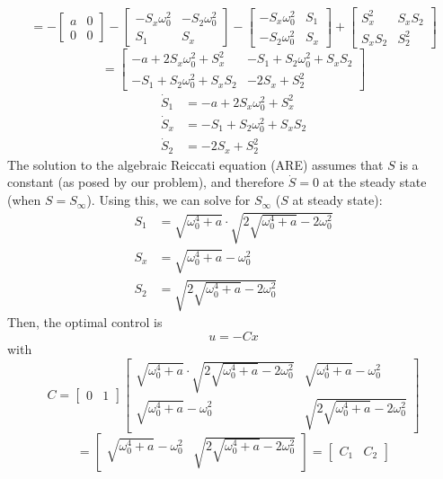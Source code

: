 \documentclass{article}
\begin{document}
\[= -\left[\begin{matrix}
    a & 0 \\
    0 & 0
\end{matrix}\right] - \left[\begin{matrix}
    -S_x\omega_0^2 & -S_2\omega_0^2 \\
    S_1 & S_x
\end{matrix}\right] - \left[\begin{matrix}
    -S_x\omega_0^2 & S_1 \\
    -S_2\omega_0^2 & S_x
\end{matrix}\right] + \left[\begin{matrix}
    S_x^2 & S_xS_2 \\
    S_xS_2 & S_2^2
\end{matrix}\right]\]
\[= \left[\begin{matrix}
    -a+2S_x\omega_0^2+S_x^2 & -S_1+S_2\omega_0^2+S_xS_2 \\
    -S_1+S_2\omega_0^2+S_xS_2 & -2S_x+S_2^2
\end{matrix}\right]\]
\begin{align*}
    \dot{S}_1 &= -a+2S_x\omega_0^2+S_x^2 \\
    \dot{S}_x &= -S_1+S_2\omega_0^2+S_xS_2 \\
    \dot{S}_2 &= -2S_x+S_2^2
\end{align*}
The solution to the algebraic Reiccati equation (ARE) assumes that $S$ is a constant
(as posed by our problem), and therefore $\dot{S} = 0$ at the steady state (when $S = S_\infty$).
Using this, we can solve for $S_\infty$ ($S$ at steady state):
\begin{align*}
    S_1 &= \sqrt{\omega_0^4+a} \cdot \sqrt{2\sqrt{\omega_0^4+a}-2\omega_0^2} \\
    S_x &= \sqrt{\omega_0^4+a}-\omega_0^2 \\
    S_2 &= \sqrt{2\sqrt{\omega_0^4+a}-2\omega_0^2}
\end{align*}
Then, the optimal control is
\[u = -Cx\]
with
\[C = \left[\begin{matrix}
    0 & 1
\end{matrix}\right]\left[\begin{matrix}
    \sqrt{\omega_0^4+a} \cdot \sqrt{2\sqrt{\omega_0^4+a}-2\omega_0^2} & \sqrt{\omega_0^4+a}-\omega_0^2 \\
    \sqrt{\omega_0^4+a}-\omega_0^2 & \sqrt{2\sqrt{\omega_0^4+a}-2\omega_0^2}
\end{matrix}\right]\]
\[= \left[\begin{matrix}
    \sqrt{\omega_0^4+a}-\omega_0^2 & \sqrt{2\sqrt{\omega_0^4+a}-2\omega_0^2}
\end{matrix}\right] = \left[\begin{matrix}
    C_1 & C_2
\end{matrix}\right]\]
\end{document}
